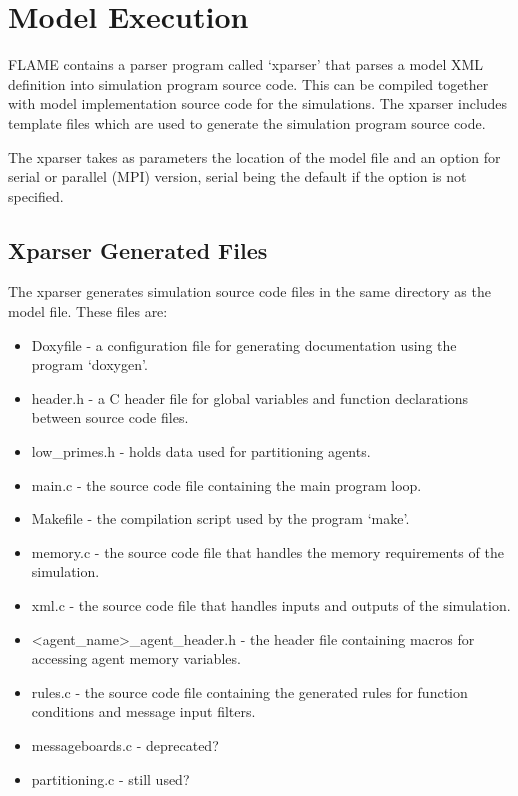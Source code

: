 \section{Model Execution}
\label{model_execution}

FLAME contains a parser program called `xparser' that parses a model
XML definition into simulation program source code. This can be compiled
together with model implementation source code for the simulations. The xparser includes
template files which are used to generate the simulation program source code.

The xparser takes as parameters the location of the model file and an option
for serial or parallel (MPI) version, serial being the default if the option is
not specified.

\subsection{Xparser Generated Files}

The xparser  generates simulation source code files in the same directory
as the model file. These files are:

\begin{itemize}
  \item Doxyfile - a configuration file for generating documentation using
 the program `doxygen'.
  \item header.h - a C header file for global variables and function
  declarations between source code files.
  \item low\_primes.h - holds data used for partitioning agents.
  \item main.c - the source code file containing the main program loop.
  \item Makefile - the compilation script used by the program `make'.
  \item memory.c - the source code file that handles the memory requirements
  of the simulation.
  \item xml.c - the source code file that handles inputs and outputs of the
  simulation.
  \item <agent\_name>\_agent\_header.h - the header file containing macros for
  accessing agent memory variables.
  \item rules.c - the source code file containing the generated rules for
  function conditions and message input filters.
  \item messageboards.c - deprecated?
  \item partitioning.c - still used?
\end{itemize}

